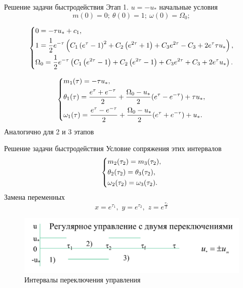 \documentclass[10pt]{beamer}
\begin{document}
\begin{frame}{Решение задачи быстродействия}
	Этап 1. $u=-u_*$ начальные условия
	\[
		m(0)=0;\ \theta(0)=1;\ \omega(0)=\Omega_0;
	\]

	\[
		\left\{ {\begin{aligned}
					 & 0 = -\tau  u_*+c_1, \hfill                                                            \\
					 & 1 = \frac{1}{2} e^{-\tau } \left(C_1 \left(e^{\tau }-1\right)^2+C_2 \left(e^{2
					\tau }+1\right)+C_3 e^{2 \tau }-C_3+2 e^{\tau } \tau  u_*\right) , \hfill                \\
					 & \Omega_0 = \frac{1}{2} e^{-\tau } \left(C_1 \left(e^{2 \tau }-1\right)+C_2 \left(e^{2
					\tau }-1\right)+C_3 e^{2 \tau }+C_3+2 e^{\tau } u_*\right)  . \hfill                     \\
				\end{aligned}} \right.
	\]

	\[
		\left\{ {\begin{aligned}
					 & m_1(\tau) = -\tau  u_*, \hfill                                                                         \\
					 & \theta_1(\tau) = \frac{e^\tau+e^{-\tau}}{2}+\frac{\Omega_0-u_*}{2}(e^\tau-e^{-\tau})+\tau u_* , \hfill \\
					 & \omega_1(\tau) =\frac{e^\tau-e^{-\tau}}{2}+\frac{\Omega_0-u_*}{2}(e^\tau+e^{-\tau})+u_*   . \hfill     \\
				\end{aligned}} \right.
	\]
	Аналогично для 2 и 3 этапов
\end{frame}
\begin{frame}{Решение задачи быстродействия}
	Условие сопряжения этих интервалов
	\[
		\left\{ {\begin{aligned}
					 & m_2(\tau_2) = m_3(\tau_2), \hfill            \\
					 & \theta_2(\tau_2) =  \theta_3(\tau_2), \hfill \\
					 & \omega_2(\tau_2) = \omega_3(\tau_2) . \hfill \\
				\end{aligned}} \right.
	\]
	Замена переменных
	\[
		x=e^{\tau_1} ,\,\,y=e^{\tau_2} ,\,\,z=e^{\frac{\tau_f}{2}}
	\]
	\begin{figure}[h!]
		\includegraphics[width=0.8\linewidth]{images/control_intervals.png}
		\caption{Интервалы переключения управления}
	\end{figure}

\end{frame}
\end{document}
